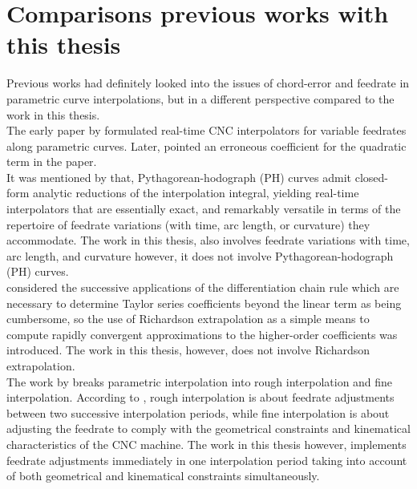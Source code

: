 \section{Comparisons previous works with this thesis}

Previous works had definitely looked into the issues of chord-error and feedrate in parametric curve interpolations, but in a different perspective compared to the work in this thesis. \\

The early paper by \cite{Yeh-etal:1999} formulated real-time CNC interpolators for variable feedrates along parametric curves. Later, \cite{Farouki-etal:2001} pointed an erroneous coefficient for the quadratic term in the paper. \\

It was mentioned by \cite{Farouki-etal:2001} that, Pythagorean-hodograph (PH) curves admit closed-form analytic reductions of the interpolation integral, yielding real-time interpolators that are essentially exact, and remarkably versatile in terms of the repertoire of feedrate variations (with time, arc length, or curvature) they accommodate. The work in this thesis, also involves feedrate variations with time, arc length, and curvature however, it does not involve Pythagorean-hodograph (PH) curves. \\

\cite{Farouki:2021} considered the successive applications of the differentiation chain rule which are necessary to determine Taylor series coefficients beyond the linear term as being cumbersome, so the use of Richardson extrapolation as a simple means to compute rapidly convergent approximations to the higher-order coefficients was introduced. The work in this thesis, however, does not involve Richardson extrapolation. \\

The work by \cite{Jin-etal:2014} breaks parametric interpolation into rough interpolation and fine interpolation. According to \cite{Jin-etal:2014}, rough interpolation is about feedrate adjustments between two successive interpolation periods, while fine interpolation is about adjusting the feedrate to comply with the geometrical constraints and kinematical characteristics of the CNC machine. The work in this thesis however, implements feedrate adjustments immediately in one interpolation period taking into account of both  geometrical and kinematical constraints simultaneously. \\

